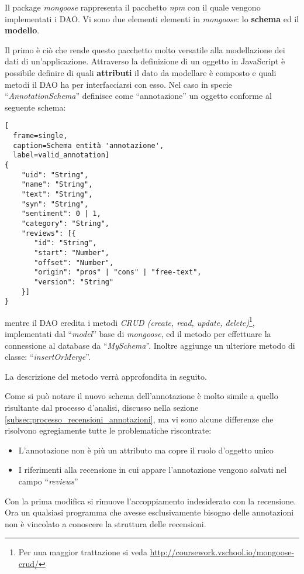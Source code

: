 Il package \textit{mongoose} rappresenta il pacchetto \textit{npm} con il quale
vengono implementati i \gls{DAO}. Vi sono due elementi elementi in
\textit{mongoose}: lo \textbf{schema} ed il \textbf{modello}.

Il primo è ciò che rende questo pacchetto molto versatile alla modellazione dei
dati di un'applicazione. Attraverso la definizione di un oggetto in JavaScript è
possibile definire di quali \textbf{attributi} il dato da modellare è composto e
quali metodi il \gls{DAO} ha per interfacciarsi con esso. Nel caso in specie
``\textit{AnnotationSchema}'' definisce come ``annotazione'' un oggetto conforme
al seguente schema:
\begin{center}
\begin{lstlisting}[
  frame=single,
  caption=Schema entità 'annotazione',
  label=valid_annotation]
{
    "uid": "String",
    "name": "String",
    "text": "String",
    "syn": "String",
    "sentiment": 0 | 1,
    "category": "String",
    "reviews": [{
       "id": "String",
       "start": "Number",
       "offset": "Number",
       "origin": "pros" | "cons" | "free-text",
       "version": "String"
    }]
}
\end{lstlisting}
\end{center}

mentre il \gls{DAO} eredita i metodi \textit{CRUD (create, read, update,
delete)}\footnote{Per una maggior trattazione si veda
\url{http://coursework.vschool.io/mongoose-crud/}}, implementati dal
``\textit{model}'' base di \textit{mongoose}, ed il metodo per effettuare la
connessione al database da ``\textit{MySchema}''. Inoltre aggiunge un
ulteriore metodo di classe: ``\textit{insertOrMerge}''.

La descrizione del metodo verrà approfondita in seguito.

Come si può notare il nuovo schema dell'annotazione è molto simile a quello
risultante dal processo d'analisi, discusso nella sezione
\ref{subsec:processo_recensioni_annotazioni}, ma vi sono alcune differenze che
risolvono egregiamente tutte le problematiche riscontrate:
\begin{itemize}
\item L'annotazione non è più un attributo ma copre il ruolo d'oggetto unico
\item I riferimenti alla recensione in cui appare l'annotazione vengono salvati
nel campo ``\textit{reviews}''
\end{itemize}

Con la prima modifica si rimuove l'accoppiamento indesiderato con la recensione.
Ora un qualsiasi programma che avesse esclusivamente bisogno delle annotazioni
non è vincolato a conoscere la struttura delle recensioni.

